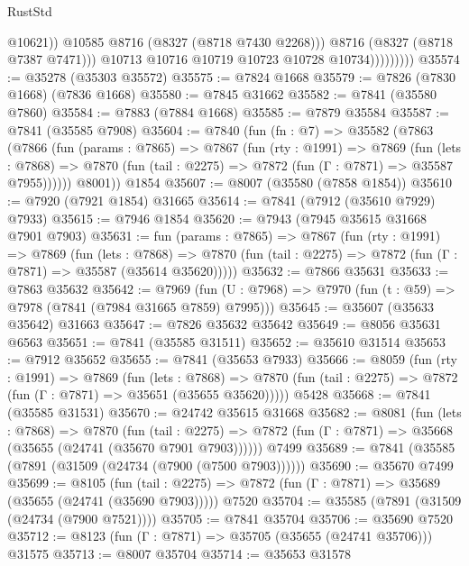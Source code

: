 \begin{lexlean}{RustStd}
\begin{coremodule}
                              @10621))
                          @10585
                          @8716
                          (@8327 (@8718 @7430 @2268)))
                        @8716
                        (@8327 (@8718 @7387 @7471)))
                      @10713
                      @10716
                      @10719
                      @10723
                      @10728
                      @10734)))))))))
@35574 := @35278 (@35303 @35572)
@35575 := @7824 @1668
@35579 := @7826 (@7830 @1668) (@7836 @1668)
@35580 := @7845 @31662
@35582 := @7841 (@35580 @7860)
@35584 := @7883 (@7884 @1668)
@35585 := @7879 @35584
@35587 := @7841 (@35585 @7908)
@35604 := @7840
    (fun (fn : @7) =>
    @35582
      (@7863
        (@7866
          (fun (params : @7865) =>
          @7867
            (fun (rty : @1991) =>
            @7869
              (fun (lets : @7868) =>
              @7870 (fun (tail : @2275) => @7872 (fun (Γ : @7871) => @35587 @7955))))))
        @8001))
    @1854
@35607 := @8007 (@35580 (@7858 @1854))
@35610 := @7920 (@7921 @1854) @31665
@35614 := @7841 (@7912 (@35610 @7929) @7933)
@35615 := @7946 @1854
@35620 := @7943 (@7945 @35615 @31668 @7901 @7903)
@35631 := fun (params : @7865) =>
  @7867
    (fun (rty : @1991) =>
    @7869
      (fun (lets : @7868) =>
      @7870 (fun (tail : @2275) => @7872 (fun (Γ : @7871) => @35587 (@35614 @35620)))))
@35632 := @7866 @35631
@35633 := @7863 @35632
@35642 := @7969
    (fun (U : @7968) => @7970 (fun (t : @59) => @7978 (@7841 (@7984 @31665 @7859) @7995)))
@35645 := @35607 (@35633 @35642) @31663
@35647 := @7826 @35632 @35642
@35649 := @8056 @35631 @6563
@35651 := @7841 (@35585 @31511)
@35652 := @35610 @31514
@35653 := @7912 @35652
@35655 := @7841 (@35653 @7933)
@35666 := @8059
    (fun (rty : @1991) =>
    @7869
      (fun (lets : @7868) =>
      @7870 (fun (tail : @2275) => @7872 (fun (Γ : @7871) => @35651 (@35655 @35620)))))
    @5428
@35668 := @7841 (@35585 @31531)
@35670 := @24742 @35615 @31668
@35682 := @8081
    (fun (lets : @7868) =>
    @7870
      (fun (tail : @2275) =>
      @7872 (fun (Γ : @7871) => @35668 (@35655 (@24741 (@35670 @7901 @7903))))))
    @7499
@35689 := @7841 (@35585 (@7891 (@31509 (@24734 (@7900 (@7500 @7903))))))
@35690 := @35670 @7499
@35699 := @8105
    (fun (tail : @2275) => @7872 (fun (Γ : @7871) => @35689 (@35655 (@24741 (@35690 @7903)))))
    @7520
@35704 := @35585 (@7891 (@31509 (@24734 (@7900 @7521))))
@35705 := @7841 @35704
@35706 := @35690 @7520
@35712 := @8123 (fun (Γ : @7871) => @35705 (@35655 (@24741 @35706))) @31575
@35713 := @8007 @35704
@35714 := @35653 @31578

\end{coremodule}
\end{lexlean}
